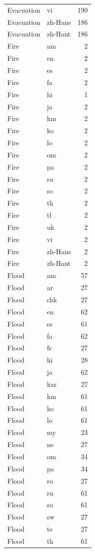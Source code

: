 \begin{longtable}{p{3cm} p{3cm} r}
Evacuation & vi & 190 \\
Evacuation & zh-Hans & 186 \\
Evacuation & zh-Hant & 186 \\
Fire & am & 2 \\
Fire & en & 2 \\
Fire & es & 2 \\
Fire & fa & 2 \\
Fire & hi & 1 \\
Fire & ja & 2 \\
Fire & km & 2 \\
Fire & ko & 2 \\
Fire & lo & 2 \\
Fire & om & 2 \\
Fire & pa & 2 \\
Fire & ru & 2 \\
Fire & so & 2 \\
Fire & th & 2 \\
Fire & tl & 2 \\
Fire & uk & 2 \\
Fire & vi & 2 \\
Fire & zh-Hans & 2 \\
Fire & zh-Hant & 2 \\
Flood & am & 57 \\
Flood & ar & 27 \\
Flood & chk & 27 \\
Flood & en & 62 \\
Flood & es & 61 \\
Flood & fa & 62 \\
Flood & fr & 27 \\
Flood & hi & 28 \\
Flood & ja & 62 \\
Flood & kar & 27 \\
Flood & km & 61 \\
Flood & ko & 61 \\
Flood & lo & 61 \\
Flood & my & 23 \\
Flood & ne & 27 \\
Flood & om & 34 \\
Flood & pa & 34 \\
Flood & ro & 27 \\
Flood & ru & 61 \\
Flood & so & 61 \\
Flood & sw & 27 \\
Flood & te & 27 \\
Flood & th & 61 \\

\end{longtable}
